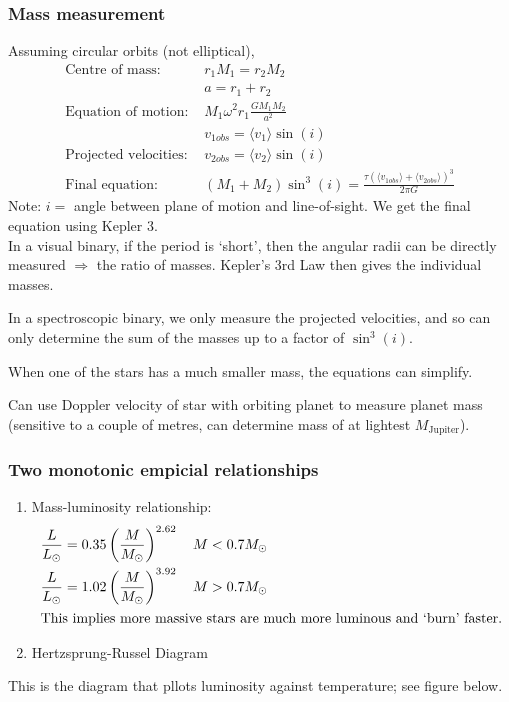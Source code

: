 \documentclass[a4paper]{article} %
\begin{document}
\subsubsection{Mass measurement}
Assuming circular orbits (not elliptical),
\begin{align*}
\text{Centre of mass: }&r_1 M_1=r_2 M_2\\
&a=r_1+r_2\\
\text{Equation of motion: }&M_1 \omega^2 r_1\frac{GM_1 M_2}{a^2}\\
&v_{1obs}=\langle v_1 \rangle \sin(i)\\
\text{Projected velocities: }&v_{2obs}=\langle v_2\rangle \sin(i)\\
\text{Final equation: }&(M_1+M_2)\sin^3(i)=\frac{\tau(\langle v_{1obs}\rangle+\langle v_{2obs}\rangle)^3}{2\pi G}
\end{align*}
Note: $i=$ angle between plane of motion and line-of-sight. We get the final equation using Kepler 3.\\

In a visual binary, if the period is ‘short’, then the angular radii can be directly measured $\Rightarrow$ the ratio of masses. Kepler’s 3rd Law then gives the individual masses.

In a spectroscopic binary, we only measure the projected velocities, and so can only determine the sum of the masses up to a factor of $\sin^3(i)$.

When one of the stars has a much smaller mass, the equations can simplify.

Can use Doppler velocity of star with orbiting planet to measure planet mass (sensitive to a couple of metres, can determine mass of at lightest $M_{\text{Jupiter}}$).

\subsubsection{Two monotonic empicial relationships}
\begin{enumerate}
\item Mass-luminosity relationship:
\begin{align*}
\frac{L}{L_{\odot}}&=0.35\left(\frac{M}{M_{\odot}}\right)^{2.62}\quad M<0.7M_\odot\\
\frac{L}{L_{\odot}}&=1.02\left(\frac{M}{M_{\odot}}\right)^{3.92}\quad M>0.7M_\odot\\
\intertext{This implies more massive stars are much more luminous and `burn' faster.}
\end{align*}
\item Hertzsprung-Russel Diagram
\end{enumerate}
This is the diagram that pllots luminosity against temperature; see figure below.
\end{document}
